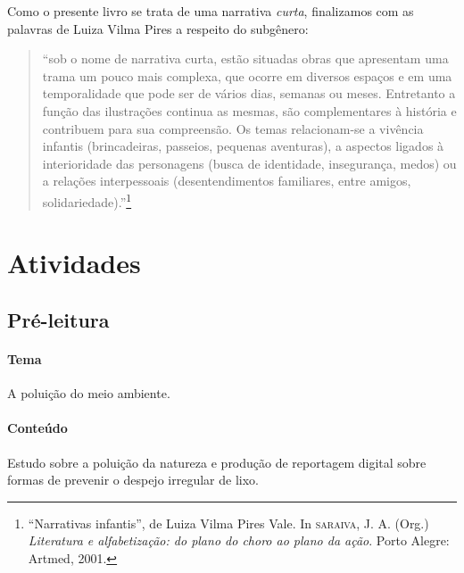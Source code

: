 \documentclass[11pt]{extarticle}
\begin{document}
Como o presente livro se trata de uma narrativa \textit{curta}, finalizamos com as palavras de Luiza Vilma Pires a respeito do
subgênero:

\begin{quote}
``sob o nome de narrativa curta, estão situadas obras que apresentam uma trama um pouco mais complexa, que ocorre em diversos espaços e em uma temporalidade que pode ser de vários dias, semanas ou meses. Entretanto a função das ilustrações continua as mesmas, são complementares à história e contribuem para sua compreensão. Os temas relacionam-se a vivência infantis (brincadeiras, passeios, pequenas aventuras), a aspectos ligados à interioridade das personagens (busca de identidade, insegurança,  
medos) ou a relações interpessoais (desentendimentos familiares, entre amigos, solidariedade).''\footnote{“Narrativas infantis”, de Luiza Vilma Pires Vale. In \textsc{saraiva}, J. A. (Org.) \textit{Literatura e alfabetização: do plano do choro ao plano da ação}. Porto Alegre: Artmed, 2001.} 
\end{quote}

\section{Atividades}

\subsection{Pré-leitura}


\paragraph{Tema} A poluição do meio ambiente.

\paragraph{Conteúdo} Estudo sobre a poluição da natureza e produção de reportagem digital sobre formas de prevenir o despejo irregular de lixo.
\end{document}
